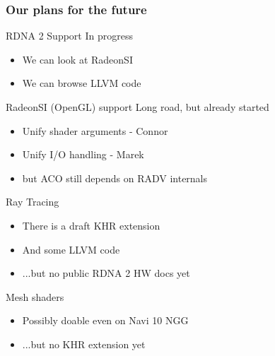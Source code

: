\documentclass[aspectratio=169,t,xcolor=table]{beamer}
\begin{document}
\begin{frame}{}
    \frametitle{Our plans for the future}
\end{frame}

\begin{frame}{RDNA 2 Support}
    \LARGE
    In progress
    \begin{itemize}
        \item We can look at RadeonSI
        \item We can browse LLVM code
    \end{itemize}
\end{frame}

\begin{frame}{RadeonSI (OpenGL) support}
    \LARGE
    Long road, but already started
    \begin{itemize}
        \item Unify shader arguments - Connor
        \item Unify I/O handling - Marek
        \item but ACO still depends on RADV internals
    \end{itemize}
\end{frame}

\begin{frame}{Ray Tracing}
    \LARGE
    \begin{itemize}
        \item There is a draft KHR extension
        \item And some LLVM code
        \item ...but no public RDNA 2 HW docs yet
    \end{itemize}
\end{frame}

\begin{frame}{Mesh shaders}
    \LARGE
    \begin{itemize}
        \item Possibly doable even on Navi 10 NGG
        \item ...but no KHR extension yet
    \end{itemize}
\end{frame}
\end{document}
